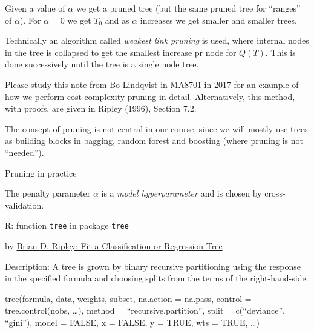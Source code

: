 \documentclass[
  ignorenonframetext,
]{beamer}
\begin{document}
\begin{frame}

Given a value of \(\alpha\) we get a pruned tree (but the same pruned
tree for ``ranges'' of \(\alpha\)). For \(\alpha=0\) we get \(T_0\) and
as \(\alpha\) increases we get smaller and smaller trees.

Technically an algorithm called \emph{weakest link pruning} is used,
where internal nodes in the tree is collapsed to get the smallest
increase pr node for \(Q(T)\). This is done successively until the tree
is a single node tree.

Please study this
\href{https://www.math.ntnu.no/emner/TMA4268/2018v/notes/CART1MA87012017BoLindqvist.pdf}{note
from Bo Lindqvist in MA8701 in 2017} for an example of how we perform
cost complexity pruning in detail. Alternatively, this method, with
proofs, are given in Ripley (1996), Section 7.2.

The consept of pruning is not central in our course, since we will
mostly use trees as building blocks in bagging, random forest and
boosting (where pruning is not ``needed'').

\end{frame}

\begin{frame}

\begin{block}{Pruning in practice}

The penalty parameter \(\alpha\) is a \emph{model hyperparameter} and is
chosen by cross-validation.

\end{block}

\end{frame}

\begin{frame}[fragile]

\begin{block}{R: function \texttt{tree} in package \texttt{tree}}

by \href{https://cran.r-project.org/web/packages/tree/index.html}{Brian
D. Ripley: Fit a Classification or Regression Tree}

Description: A tree is grown by binary recursive partitioning using the
response in the specified formula and choosing splits from the terms of
the right-hand-side.

tree(formula, data, weights, subset, na.action = na.pass, control =
tree.control(nobs, \ldots), method = ``recursive.partition'', split =
c(``deviance'', ``gini''), model = FALSE, x = FALSE, y = TRUE, wts =
TRUE, \ldots)

\end{block}

\end{frame}
\end{document}
